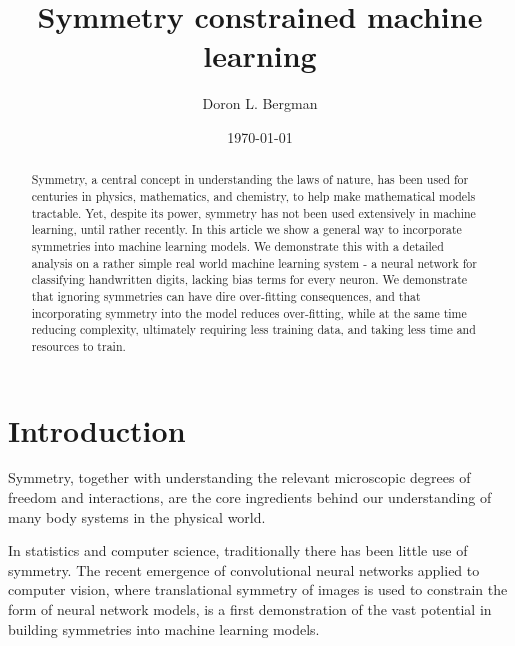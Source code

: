 \documentclass[twocolumn, prl, nofootinbib]{revtex4-1}
\begin{document}
\newcommand{\be}{\begin{equation}}
\newcommand{\ee}{\end{equation}}


\title{Symmetry constrained machine learning}
\date{\today}

\author{Doron L. Bergman}

\begin{abstract}
Symmetry, a central concept in understanding the laws of nature, has been used for centuries in physics, mathematics, and chemistry, to help make mathematical models tractable. Yet, despite its power, symmetry has not been used extensively in machine learning, until rather recently. In this article we show a general way to incorporate symmetries into machine learning models. We demonstrate this with a detailed analysis on a rather simple real world machine learning system - a neural network for classifying handwritten digits, lacking bias terms for every neuron. We demonstrate that ignoring symmetries can have dire over-fitting consequences, and that incorporating symmetry into the model reduces over-fitting, while at the same time reducing complexity, ultimately requiring less training data, and taking less time and resources to train.
\end{abstract}

\maketitle


\section{Introduction}
\label{Sec:Intro}


Symmetry, together with understanding the relevant microscopic degrees of freedom and interactions, are the core ingredients behind our understanding of many body systems in the physical world.


In statistics and computer science, traditionally there has been little use of symmetry. The recent emergence of convolutional neural networks applied to computer vision\cite{lecun1999object, lecun1990handwritten, lecun1998gradient, krizhevsky2012imagenet, lee2009convolutional, lecun2015deep}, where translational symmetry of images is used to constrain the form of neural network models, is a first demonstration of the vast potential in building symmetries into machine learning models.
\end{document}

